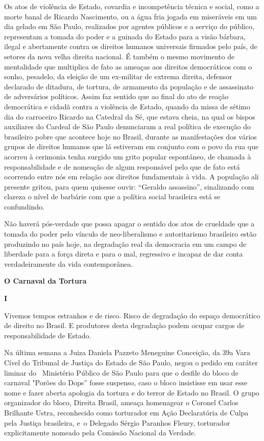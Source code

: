 Os atos de violência de Estado, covardia e incompetência técnica e
social, como a morte banal de Ricardo Nascimento, ou a água fria jogada
em miseráveis em um dia gelado em São Paulo, realizados por agentes
públicos e a serviço do público, representam a tomada do poder e a
guinada do Estado para a visão bárbara, ilegal e abertamente contra os
direitos humanos universais firmados pelo país, de setores da nova velha
direita nacional. É também o mesmo movimento de mentalidade que
multiplica de fato as ameaças aos direitos democráticos com o sonho,
pesadelo, da eleição de um ex-militar de extrema direita, defensor
declarado de ditadura, de tortura, de armamento da população e de
assassinato de adversários políticos. Assim faz sentido que ao final do
ato de reação democrática e cidadã contra a violência de Estado, quando
da missa de sétimo dia do carroceiro Ricardo na Catedral da Sé, que
estava cheia, na qual os bispos auxiliares do Cardeal de São Paulo
denunciaram a real política de execução do brasileiro pobre que acontece
hoje no Brasil, durante as manifestações dos vários grupos de direitos
humanos que lá estiveram em conjunto com o povo da rua que acorreu à
cerimonia tenha surgido um grito popular espontâneo, de chamada à
responsabilidade e de nomeação de algum responsável pelo que de fato
está ocorrendo entre nós em relação aos direitos fundamentais à vida. A
população ali presente gritou, para quem quisesse ouvir: ``Geraldo
assassino'', sinalizando com clareza o nível de barbárie com que a
política social brasileira está se confundindo.

Não haverá pós-verdade que possa apagar o sentido dos atos de crueldade
que a tomada do poder pelo vínculo de neo-liberalismo e autoritarismo
brasileiro estão produzindo no país hoje, na degradação real da
democracia em um campo de liberdade para a força direta e para o mal,
regressivo e incapaz de dar conta verdadeiramente da vida contemporânea.

\textbf{O Carnaval da Tortura}

\textbf{I}

Vivemos tempos estranhos e de risco. Risco de degradação do espaço
democrático de direito no Brasil. E produtores desta degradação podem
ocupar cargos de responsabilidade de Estado.

Na última semana a Juiza Daniela Pazzeto Meneguine Conceição, da 39a
Vara Cível do Tribunal de Justiça do Estado de São Paulo, negou o pedido
em caráter liminar do~ Ministério Público de São Paulo para que o
desfile do bloco de carnaval "Porões do Dops'' fosse suspenso, caso o
bloco insistisse em usar esse nome e fazer aberta apologia da tortura e
do terror de Estado no Brasil. O grupo organizador do bloco, Direita
Brasil, ameaça homenagear o Coronel Carlos Brilhante Ustra, reconhecido
como torturador em Ação Declaratória de Culpa pela Justiça brasileira,
e~o Delegado Sérgio Paranhos Fleury, torturador explicitamente nomeado
pela Comissão Nacional da Verdade.


